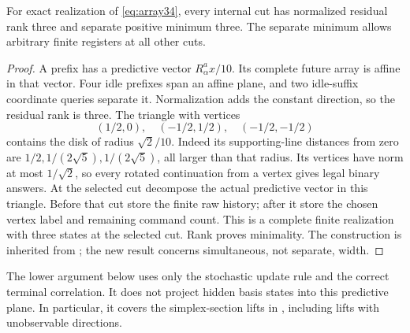 \begin{proposition}
\label{prop:separate34}
For exact realization of \eqref{eq:array34}, every internal cut has
normalized residual rank three and separate positive minimum three.
The separate minimum allows arbitrary finite registers at all other cuts.
\end{proposition}
\begin{proof}
A prefix has a predictive vector $R_\alpha^a x/10$. Its complete future
array is affine in that vector. Four idle prefixes span an affine plane,
and two idle-suffix coordinate queries separate it. Normalization adds
the constant direction, so the residual rank is three.
The triangle with vertices
\[
 (1/2,0),\quad(-1/2,1/2),\quad(-1/2,-1/2)
\]
contains the disk of radius $\sqrt2/10$. Indeed its supporting-line
distances from zero are $1/2,1/(2\sqrt5),1/(2\sqrt5)$, all larger
than that radius. Its vertices have norm at most $1/\sqrt2$, so every
rotated continuation from a vertex gives legal binary answers.
At the selected cut decompose the actual predictive vector in this
triangle. Before that cut store the finite raw history; after it store
the chosen vertex label and remaining command count. This is a complete
finite realization with three states at the selected cut. Rank proves
minimality. The construction is inherited from \cite{GTF32,GTF33}; the
new result concerns simultaneous, not separate, width.
\end{proof}

The lower argument below uses only the stochastic update rule and the
correct terminal correlation. It does not project hidden basis states
into this predictive plane. In particular, it covers the simplex-section
lifts in \cite{GTF33}, including lifts with unobservable directions.
